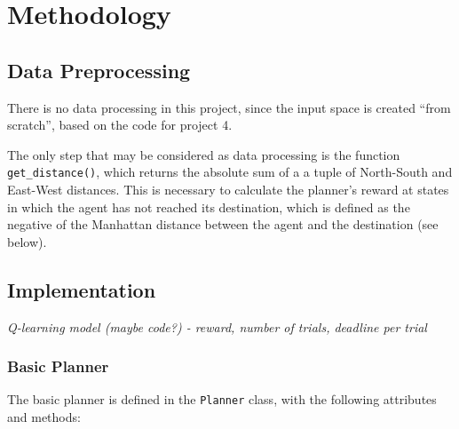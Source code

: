 \documentclass{article}
\begin{document}
\section{Methodology}

\subsection{Data Preprocessing}
There is no data processing in this project, since the input space is created ``from scratch'', based on the code for project 4.

The only step that may be considered as data processing is the function \texttt{get\_distance()}, which returns the absolute sum of a a tuple of North-South and East-West distances. This is necessary to calculate the planner's reward at states in which the agent has not reached its destination, which is defined as the negative of the Manhattan distance between the agent and the destination (see below).

\subsection{Implementation}
\label{sec:implementation}
\textit{Q-learning model (maybe code?) - reward, number of trials, deadline per trial}

\subsubsection{Basic Planner}
\label{subsec:basic}

The basic planner is defined in the \texttt{Planner} class, with the following attributes and methods:
\end{document}
